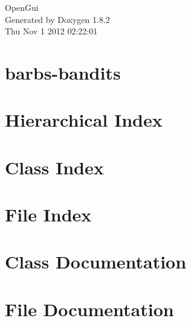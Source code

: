 \documentclass{book}
\begin{document}
\hypersetup{pageanchor=false,citecolor=blue}
\begin{titlepage}
\vspace*{7cm}
\begin{center}
{\Large Open\-Gui }\\
\vspace*{1cm}
{\large Generated by Doxygen 1.8.2}\\
\vspace*{0.5cm}
{\small Thu Nov 1 2012 02:22:01}\\
\end{center}
\end{titlepage}
\clearemptydoublepage
{}
\tableofcontents
\clearemptydoublepage
{}
\hypersetup{pageanchor=true,citecolor=blue}
\chapter{barbs-\/bandits}
\label{md_README}
\hypertarget{md_README}{}

\chapter{Hierarchical Index}

\chapter{Class Index}

\chapter{File Index}

\chapter{Class Documentation}









\chapter{File Documentation}






















\printindex
\end{document}

